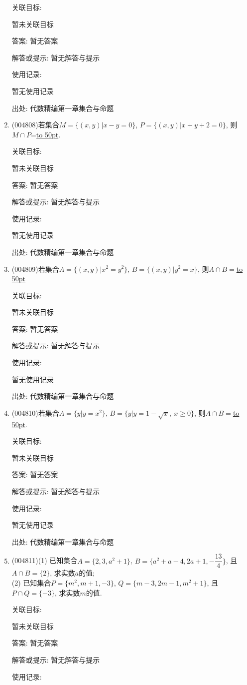 \documentclass[10pt,a4paper]{article}
\newcommand{\blank}[1]{\underline{\hbox to #1pt{}}}
\begin{document}
\begin{enumerate}[1.]
关联目标:

暂未关联目标

答案: 暂无答案

解答或提示: 暂无解答与提示

使用记录:

暂无使用记录


出处: 代数精编第一章集合与命题
\item { (004808)}若集合$M=\{(x,y)|x-y=0\}$, $P=\{(x,y)|x+y+2=0\}$, 则$M\cap P$=\blank{50}.


关联目标:

暂未关联目标

答案: 暂无答案

解答或提示: 暂无解答与提示

使用记录:

暂无使用记录


出处: 代数精编第一章集合与命题
\item { (004809)}若集合$A=\{(x,y)|x^2=y^2\}$, $B=\{(x,y)|y^2=x\}$, 则$A\cap B=$\blank{50}


关联目标:

暂未关联目标

答案: 暂无答案

解答或提示: 暂无解答与提示

使用记录:

暂无使用记录


出处: 代数精编第一章集合与命题
\item { (004810)}若集合$A=\{y|y =x^2\}$, $B=\{y|y=1-\sqrt x, \ x\ge 0\}$, 则$A\cap B=$\blank{50}.


关联目标:

暂未关联目标

答案: 暂无答案

解答或提示: 暂无解答与提示

使用记录:

暂无使用记录


出处: 代数精编第一章集合与命题
\item { (004811)}(1) 已知集合$A=\{2,3,a^2+1\}$, $B=\{a^2+a-4,2a+1,-\dfrac{13}4\}$, 且$A\cap B=\{2\}$, 求实数$a$的值;\\
(2) 已知集合$P=\{m^2,m+1,-3\}$, $Q=\{m-3,2m-1,m^2+1\}$, 且$P\cap Q=\{-3\}$, 求实数$m$的值.


关联目标:

暂未关联目标

答案: 暂无答案

解答或提示: 暂无解答与提示

使用记录:


\end{enumerate}
\end{document}
